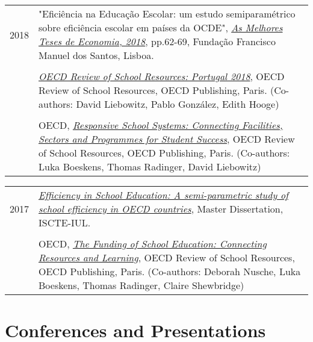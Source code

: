 \documentclass[a4paper,11pt]{article} %
\begin{document}
\begin{tabular}{r|p{13cm}}
	2018 &  "Eficiência na Educação Escolar: um estudo semiparamétrico sobre eficiência escolar em países da OCDE", \href{https://www.ffms.pt/FileDownload/d6e1656d-9dde-45e9-871f-0feb67c7d7f8/as-melhores-teses-de-economia-2018}{{\textit{As Melhores Teses de Economia, 2018}}}, pp.62-69, Fundação Francisco Manuel dos Santos, Lisboa.  \\
	& \\
	& \href{http://www.oecd.org/portugal/oecd-reviews-of-school-resources-portugal-2018-9789264308411-en.htm}{\textit{OECD Review of School Resources: Portugal 2018}}, OECD Review of School Resources, OECD Publishing, Paris. (Co-authors: David Liebowitz, Pablo González, Edith Hooge)\\
	& \\
	& OECD,  \href{http://www.oecd.org/publications/responsive-school-systems-9789264306707-en.htm}{\textit{Responsive School Systems: Connecting Facilities, Sectors and Programmes for Student Success}}, OECD Review of School Resources, OECD Publishing, Paris. (Co-authors: Luka Boeskens, Thomas Radinger, David Liebowitz) \\
\end{tabular}	

\begin{tabular}{r|p{13cm}}
	2017 & \href{http://hdl.handle.net/10071/16122}{\textit{Efficiency in School Education: A semi-parametric study of school efficiency in OECD countries}}, Master Dissertation, ISCTE-IUL.\\
	& \\
	& OECD, \href{http://www.oecd.org/governance/the-funding-of-school-education-9789264276147-en.htm}{\textit{The Funding of School Education: Connecting Resources and Learning}}, OECD Review of School Resources, OECD Publishing, Paris. (Co-authors: Deborah Nusche, Luka Boeskens, Thomas Radinger, Claire Shewbridge)\\
\end{tabular}	


\section[Conferences and Presentations]{\faCommentsO \hspace{3pt} Conferences and Presentations}
\end{document}
